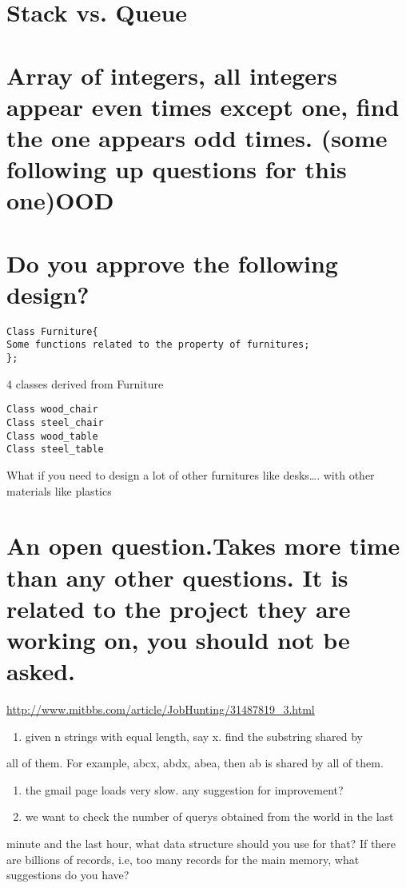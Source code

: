 \documentclass[12pt]{book}
\begin{document}
\section{Stack vs. Queue}
\label{sec-12-3}
\section{Array of integers, all integers appear even times except one, find the one appears odd times. (some following up questions for this one)OOD}
\label{sec-12-4}
\section{Do you approve the following design?}
\label{sec-12-5}
\lstset{language=java,label= ,caption= ,numbers=none}
\begin{lstlisting}
Class Furniture{    
Some functions related to the property of furnitures;
};
\end{lstlisting}
4 classes derived from Furniture
\lstset{language=java,label= ,caption= ,numbers=none}
\begin{lstlisting}
Class wood_chair
Class steel_chair
Class wood_table
Class steel_table
\end{lstlisting}
What if you need to design a lot of other furnitures like desks\ldots{}. with other materials like plastics 
\section{An open question.Takes more time than any other questions. It is related to the project they are working on, you should not be asked.}
\label{sec-12-6}

\url{http://www.mitbbs.com/article/JobHunting/31487819_3.html}

\begin{enumerate}
\item given n strings with equal length, say x. find the substring shared by
\end{enumerate}
all of them. For example, abcx, abdx, abea, then ab is shared by all of them.

\begin{enumerate}
\item the gmail page loads very slow. any suggestion for improvement?

\item we want to check the number of querys obtained from the world in the last
\end{enumerate}
minute and the last hour, what data structure should you use for that? If 
there are billions of records, i.e, too many records for the main memory, 
what suggestions do you have?
\end{document}

